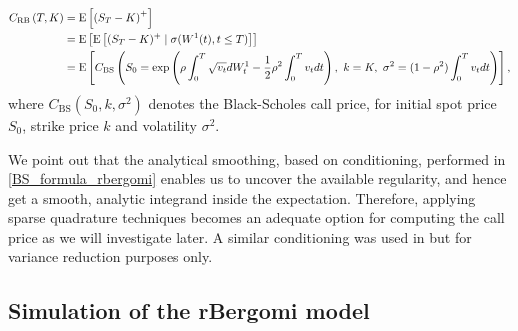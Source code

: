 \begin{align}\label{BS_formula_rbergomi}
	C_{\text{RB}}\left( T, K \right) &= \text{E}\left[ \left(S_T - K \right)^+ \right]  \nonumber\\
	&=\mathrm{E}\left[\mathrm{E}\left[(S_T-K)^+ \mid \sigma(W^1(t) ,t \le T)\right]\right]\nonumber \\
	&=\text{E}\left[C_{\text{BS}}\left( S_0 = \operatorname{exp}\left(\rho \int_0^T \sqrt{v_t} dW_t^1 - \frac{1}{2}
	\rho^2 \int_0^T v_t dt\right),\ k = K, \ \sigma^2 = (1-\rho^2)
	\int_0^T v_t dt \right) \right],
\end{align}
where $C_{\text{BS}}(S_0,k,\sigma^2)$ denotes the Black-Scholes call price, for initial spot price $S_0$, strike price $k$ and volatility $\sigma^2$.


We point out that the analytical smoothing, based on conditioning, performed in \eqref{BS_formula_rbergomi} enables us to uncover the available regularity, and hence  get a smooth, analytic integrand inside the expectation. Therefore, applying sparse quadrature techniques becomes an adequate option for computing the call price as we will investigate later. A similar conditioning was used in \cite{mccrickerd2018turbocharging} but for variance reduction purposes only.

\subsection{Simulation of the rBergomi model}\label{sec:Simulation of the rBergomi model}

